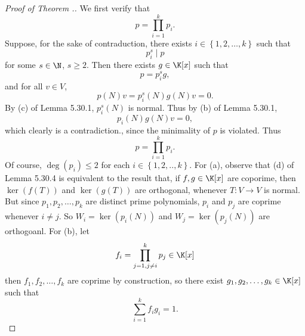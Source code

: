 \documentclass[linearalgebraII]{subfiles}
\begin{document}

    \begin{proof}[Proof of Theorem \thechapter.\thestcounter]
        We first verify that
        \begin{equation*}
            p = \prod^{k}_{i=1} p_i.
        \end{equation*}
        Suppose, for the sake of contraduction, there exists $i\in\left\lbrace 1,2,\ldots,k \right\rbrace$ such that
        \begin{equation*}
            p_i^s \mid p
        \end{equation*}
        for some $s\in\N$, $s\geq 2$. Then there exists $g\in\K[x]$ such that
        \begin{equation*}
            p = p_i^sg,
        \end{equation*}
        and for all $v\in V$,
        \begin{equation*}
            p(N)v = p_i^s(N)g(N)v = 0.
        \end{equation*}
        By (c) of Lemma 5.30.1, $p_i^s(N)$ is normal. Thus by (b) of Lemma 5.30.1, 
        \begin{equation*}
            p_i(N)g(N)v = 0,
        \end{equation*}
        which clearly is a contradiction., since the minimality of $p$ is violated. Thus
        \begin{equation*}
            p = \prod^{k}_{i=1} p_i.
        \end{equation*}
        Of course, $\deg\left( p_i \right) \leq 2$ for each $i\in\left\lbrace 1,2,..,k \right\rbrace$. For (a), observe that (d) of Lemma 5.30.4 is equivalent to the result that, if $f,g\in\K[x]$ are coporime, then $\ker\left( f(T) \right)$ and $\ker\left( g(T) \right)$ are orthogonal, whenever $T:V\to V$ is normal. But since $p_1,p_2,\ldots,p_k$ are distinct prime polynomials, $p_i$ and $p_j$ are coprime whenever $i\neq j$. So $W_i = \ker\left( p_i(N) \right) $ and $W_j = \ker\left( p_j(N) \right) $ are orthogoanl. For (b), let
        \begin{equation*}
            f_i = \prod^{k}_{j=1, j\neq i} p_j\in\K[x]
        \end{equation*}
        then $f_1,f_2,\ldots,f_k$ are coprime by construction, so there exist $g_1,g_2,\ldots,g_k\in\K[x]$ such that
        \begin{equation*}
            \sum^{k}_{i=1} f_ig_i = 1.
        \end{equation*}

\end{proof}
\end{document}
